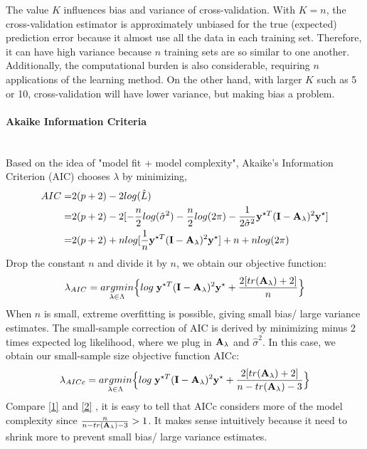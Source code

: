\documentclass[11pt]{article}
\begin{document}
The value $K$ influences bias and variance of cross-validation. With $K=n$, the cross-validation estimator is approximately unbiased for the true (expected) prediction error because it almost use all the data in each training set. Therefore, it can have high variance because $n$ training sets are so similar to one another. Additionally, the computational burden is also considerable, requiring $n$ applications of the learning method. On the other hand, with larger $K$ such as 5 \citep{hastie_elements_2009} or 10, cross-validation will have lower variance, but making bias a problem.

\paragraph{Akaike Information Criteria}\mbox{}\\
Based on the idea of "model fit + model complexity", Akaike's Information Criterion (AIC) \citep{akaike_information_1998} chooses $\lambda$ by minimizing,
\begin{align*}
AIC=&2(p+2)-2log(\hat{L})\\
=&2(p+2)-2[-\frac{n}{2}log (\hat{\sigma}^2)-\frac{n}{2}log (2\pi)-\frac{1}{2\hat{\sigma}^2}{\bf y}^{\star T}({\bf I}-{\bf A}_\lambda)^2{\bf y}^\star]\\
=&2(p+2)+n log[\frac{1}{n}{\bf y}^{\star T}({\bf I}-{\bf A}_\lambda)^2{\bf y}^\star]+n+n log(2\pi)
\end{align*}
Drop the constant $n$ and divide it by $n$, we obtain our objective function:
\begin{align}
\lambda_{AIC}=\underset{\lambda \in \Lambda}{argmin}\Big\{log\; {\bf y}^{\star T}({\bf I}-{\bf A}_\lambda)^2{\bf y}^\star+\frac{2[tr({\bf A}_\lambda)+2]}{n}\Big\} \label{1}
\end{align}
When $n$ is small, extreme overfitting is possible, giving small bias/ large variance estimates. The small-sample correction of AIC \citep{hurvich_regression_1989, hurvich_clifford_m._smoothing_2002} is derived by minimizing minus 2 times expected log likelihood, where we plug in ${\bf A}_\lambda$ and $\hat{\sigma}^2$. In this case, we obtain our small-sample size objective function AICc:
\begin{align}
\lambda_{AICc}=\underset{\lambda \in \Lambda}{argmin}\Big\{log\; {\bf y}^{\star T}({\bf I}-{\bf A}_\lambda)^2{\bf y}^\star+\frac{2[tr({\bf A}_\lambda)+2]}{n-tr({\bf A}_\lambda)-3}\Big\} \label{2}
\end{align}
Compare \eqref{1}  and \eqref{2} , it is easy to tell that AICc considers more of the model complexity since $\frac{n}{n-tr({\bf A}_\lambda)-3}>1$. It makes sense intuitively because it need to shrink more to prevent small bias/ large variance estimates.
\end{document}
